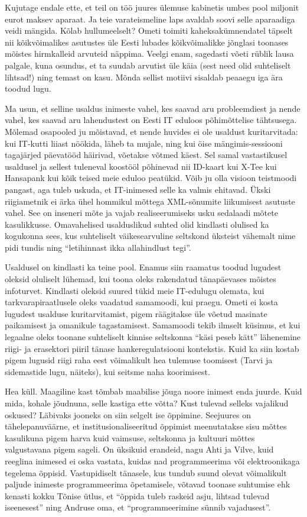 Kujutage endale ette, et teil on töö juures ülemuse kabinetis umbes pool miljonit eurot maksev aparaat. Ja teie varateismeline laps avaldab soovi selle aparaadiga veidi mängida. Kõlab hullumeelselt? Ometi toimiti kaheksakümnendatel täpselt nii kõikvõimalikes asutustes üle Eesti lubades kõikvõimalikke jõnglasi toonases mõistes hirmkalleid arvuteid näppima. Veelgi enam, sagedasti võeti rüblik lausa palgale, kuna osundus, et ta suudab arvutist üle käia (sest need olid suhteliselt lihtsad!) ning temast on kasu. Mõnda sellist motiivi sisaldab peaaegu iga ära toodud lugu.

Ma usun, et selline usaldus inimeste vahel, kes saavad aru probleemdiest ja nende vahel, kes saavad aru lahendustest on Eesti IT eduloos põhimõttelise tähtsusega. Mõlemad osapooled ju mõistavad, et nende huvides ei ole usaldust kuritarvitada: kui IT-kutti liiast nöökida, läheb ta mujale, ning kui öise mängimis-sessiooni tagajärjed päevatööd häirivad, võetakse võtmed käest. Sel samal vastastikusel usaldusel ja sellest tuleneval koostööl põhinevad nii ID-kaart kui X-Tee kui Hansapank kui kõik teised meie eduloo peatükid. Võib ju olla visioon teistmoodi pangast, aga tuleb uskuda, et IT-inimesed selle ka valmis ehitavad. Ükski riigiametnik ei ärka ühel hommikul mõttega XML-sõnumite liikumisest asutuste vahel. See on inseneri mõte ja vajab realiseerumiseks usku sedalaadi mõtete kasulikkusse. Omavahelised usalduslikud suhted olid kindlasti olulised ka kogukonna sees, kus suhteliselt väikesearvuline seltskond üksteist vähemalt nime pidi tundis ning \enquote{letihinnast ikka allahindlust tegi}. 

Usaldusel on kindlasti ka teine pool. Enamus siin raamatus toodud lugudest oleksid oluliselt lühemad, kui toona oleks rakendatud tänapäevases mõistes infoturvet. Kindlasti oleksid suured tükid meie IT-edulugu olemata, kui tarkvarapiraatlusele oleks vaadatud samamoodi, kui praegu. Ometi ei kosta lugudest usalduse kuritarvitamist, pigem räägitakse üle võetud masinate paikamisest ja omanikule tagastamisest. Samamoodi tekib ilmselt küsimus, et kui legaalne oleks toonane suhteliselt kinnise seltskonna \enquote{käsi peseb kätt} lähenemine riigi- ja erasektori piiril tänase hankeregulatsiooni kontekstis. Kuid ka siin kostab pigem lugusid riigi raha eest võimalikult hea tulemuse toomisest (Tarvi ja sidemastide lugu, näiteks), kui seitsme naha koorimisest. 

Hea küll. Maagiline kast tõmbab maabilise jõuga noore inimest enda juurde. Kuid mida, kohale jõudnuna, selle kastiga ette võtta? Kust tulevad selleks vajalikud oskused? Läbivaks jooneks on siin selgelt ise õppimine. Seejuures on tähelepanuväärne, et institusionaliseeritud õppimist meenutatakse sisu mõttes kasulikuna pigem harva kuid vaimsuse, seltskonna ja kultuuri mõttes valgustavana pigem sageli. On üksikuid erandeid, nagu Ahti ja Vilve, kuid reeglina inimesed ei oska vastata, kuidas nad programmeerima või elektroonikaga tegelema õppisid. Vastupidiselt tänasele, kus tundub suund olevat võimalikult paljude inimeste programmeerima õpetamisele, võtavad toonase suhtumise ehk kenasti kokku Tõnise ütlus, et \enquote{õppida tuleb raskeid asju, lihtsad tulevad iseenesest} ning Andruse oma, et  \enquote{programmeerimine sünnib vajadusest}. 

